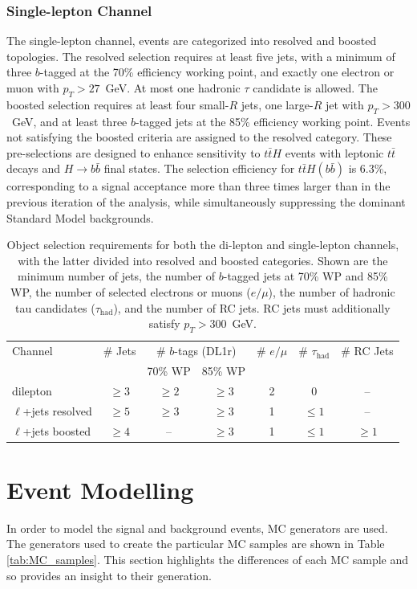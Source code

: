 \subsubsection{Single-lepton Channel}
The single-lepton channel, events are categorized into resolved and boosted topologies. The resolved selection requires at least five jets, with a minimum of three $b$-tagged at the 70\% efficiency working point, and exactly one electron or muon with $p_{T} > 27$~GeV. At most one hadronic $\tau$ candidate is allowed. The boosted selection requires at least four small-$R$ jets, one large-$R$ jet with $p_{T} > 300$~GeV, and at least three $b$-tagged jets at the 85\% efficiency working point. Events not satisfying the boosted criteria are assigned to the resolved category. These pre-selections are designed to enhance sensitivity to $t\bar{t}H$ events with leptonic $t\bar{t}$ decays and $H \to b\bar{b}$ final states. The selection efficiency for $t\bar{t}H(b\bar{b})$ is 6.3\%, corresponding to a signal acceptance more than three times larger than in the previous iteration of the analysis, while simultaneously suppressing the dominant Standard Model backgrounds.  
\begin{table}[h!]
\centering
\begin{tabular}{lcccccc}
\hline\hline
Channel & \# Jets & \multicolumn{2}{c}{\# $b$-tags (DL1r)} & \# $e/\mu$ & \# $\tau_{\text{had}}$ & \# RC Jets \\
        &         & 70\% WP & 85\% WP &         &            &            \\
\hline
dilepton       & $\geq 3$ & $\geq 2$ & $\geq 3$ & 2 & 0   & -- \\
$\ell$+jets resolved & $\geq 5$ & $\geq 3$ & $\geq 3$ & 1 & $\leq 1$ & -- \\
$\ell$+jets boosted  & $\geq 4$ & --       & $\geq 3$ & 1 & $\leq 1$ & $\geq 1$ \\
\hline\hline
\end{tabular}
\caption{Object selection requirements for both the di-lepton and single-lepton channels, with the latter divided into resolved and boosted categories. Shown are the minimum number of jets, the number of $b$-tagged jets at 70\% WP and 85\% WP, the number of selected electrons or muons ($e/\mu$), the number of hadronic tau candidates ($\tau_{\text{had}}$), and the number of RC jets. RC jets must additionally satisfy $p_{T} > 300$~GeV.}
\label{tab:selection_requirements}
\end{table}
\section{Event Modelling}
In order to model the signal and background events, MC generators are used. The generators used to create the particular MC samples are shown in Table \ref{tab:MC_samples}. This section highlights the differences of each MC sample and so provides an insight to their generation.
